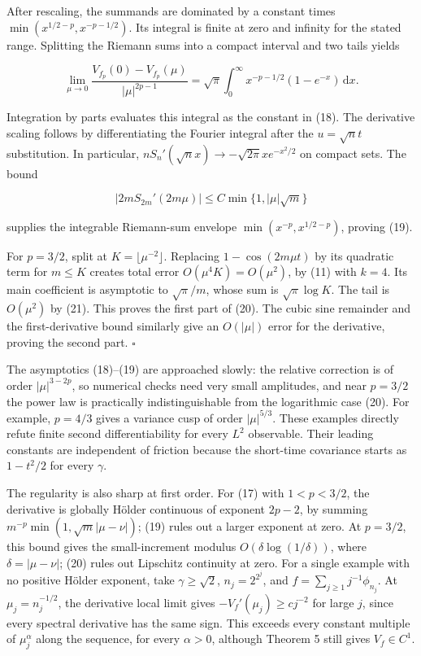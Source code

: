\documentclass[
  british,
  11pt,
  a4paper,
]{article}
\begin{document}
After rescaling, the summands are dominated by a constant times
\(\min(x^{1/2-p},x^{-p-1/2})\). Its integral is finite at zero and
infinity for the stated range. Splitting the Riemann sums into a compact
interval and two tails yields

\[
\lim_{\mu\to0}\frac{V_{f_p}(0)-V_{f_p}(\mu)}{|\mu|^{2p-1}}
=\sqrt\pi\int_0^\infty x^{-p-1/2}(1-e^{-x})\,\mathrm dx.
\]

Integration by parts evaluates this integral as the constant in (18).
The derivative scaling follows by differentiating the Fourier integral
after the \(u=\sqrt n t\) substitution. In particular,
\(nS_n'(\sqrt n x)\to-\sqrt{2\pi}x e^{-x^2/2}\) on compact sets. The
bound

\[
|2mS_{2m}'(2m\mu)|\le C\min\{1,|\mu|\sqrt m\}
\]

supplies the integrable Riemann-sum envelope \(\min(x^{-p},x^{1/2-p})\),
proving (19).

For \(p=3/2\), split at \(K=\lfloor\mu^{-2}\rfloor\). Replacing
\(1-\cos(2m\mu t)\) by its quadratic term for \(m\le K\) creates total
error \(O(\mu^4K)=O(\mu^2)\), by (11) with \(k=4\). Its main coefficient
is asymptotic to \(\sqrt\pi/m\), whose sum is \(\sqrt\pi\log K\). The
tail is \(O(\mu^2)\) by (21). This proves the first part of (20). The
cubic sine remainder and the first-derivative bound similarly give an
\(O(|\mu|)\) error for the derivative, proving the second part.
\(\square\)

The asymptotics (18)--(19) are approached slowly: the relative
correction is of order \(|\mu|^{3-2p}\), so numerical checks need very
small amplitudes, and near \(p=3/2\) the power law is practically
indistinguishable from the logarithmic case (20). For example, \(p=4/3\)
gives a variance cusp of order \(|\mu|^{5/3}\). These examples directly
refute finite second differentiability for every \(L^2\) observable.
Their leading constants are independent of friction because the
short-time covariance starts as \(1-t^2/2\) for every \(\gamma\).

The regularity is also sharp at first order. For (17) with \(1<p<3/2\),
the derivative is globally Hölder continuous of exponent \(2p-2\), by
summing \(m^{-p}\min(1,\sqrt m|\mu-\nu|)\); (19) rules out a larger
exponent at zero. At \(p=3/2\), this bound gives the small-increment
modulus \(O(\delta\log(1/\delta))\), where \(\delta=|\mu-\nu|\); (20)
rules out Lipschitz continuity at zero. For a single example with no
positive Hölder exponent, take \(\gamma\ge\sqrt2\), \(n_j=2^{2^j}\), and
\(f=\sum_{j\ge1}j^{-1}\phi_{n_j}\). At \(\mu_j=n_j^{-1/2}\), the
derivative local limit gives \(-V_f'(\mu_j)\ge c j^{-2}\) for large
\(j\), since every spectral derivative has the same sign. This exceeds
every constant multiple of \(\mu_j^\alpha\) along the sequence, for
every \(\alpha>0\), although Theorem 5 still gives \(V_f\in C^1\).
\end{document}
